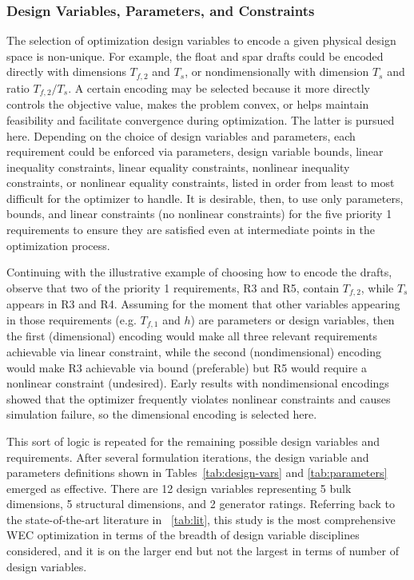 \subsubsection{Design Variables, Parameters, and Constraints}
The selection of optimization design variables to encode a given physical design space is non-unique. For example, the float and spar drafts could be encoded directly with dimensions $T_{f,2}$ and $T_s$, or nondimensionally with dimension $T_s$ and ratio $T_{f,2}/T_s$. A certain encoding may be selected because it more directly controls the objective value, makes the problem convex, or helps maintain feasibility and facilitate convergence during optimization. The latter is pursued here. Depending on the choice of design variables and parameters, each requirement could be enforced via parameters, design variable bounds, linear inequality constraints, linear equality constraints, nonlinear inequality constraints, or nonlinear equality constraints, listed in order from least to most difficult for the optimizer to handle. It is desirable, then, to use only parameters, bounds, and linear constraints (no nonlinear constraints) for the five priority 1 requirements to ensure they are satisfied even at intermediate points in the optimization process. 

Continuing with the illustrative example of choosing how to encode the drafts, observe that two of the priority 1 requirements, R3 and R5, contain $T_{f,2}$, while $T_s$ appears in R3 and R4. Assuming for the moment that other variables appearing in those requirements (e.g. $T_{f,1}$ and $h$) are parameters or design variables, then the first (dimensional) encoding would make all three relevant requirements achievable via linear constraint, while the second (nondimensional) encoding would make R3 achievable via bound (preferable) but R5 would require a nonlinear constraint (undesired). Early results with nondimensional encodings \cite{mccabe_multidisciplinary_2022} showed that the optimizer frequently violates nonlinear constraints and causes simulation failure, so the dimensional encoding is selected here.

This sort of logic is repeated for the remaining possible design variables and requirements. After several formulation iterations, the design variable and parameters definitions shown in Tables~\ref{tab:design-vars} and \ref{tab:parameters} emerged as effective. There are 12 design variables representing 5 bulk dimensions, 5 structural dimensions, and 2 generator ratings. Referring back to the state-of-the-art literature in \tablename~\ref{tab:lit}, this study is the most comprehensive WEC optimization in terms of the breadth of design variable disciplines considered, and it is on the larger end but not the largest in terms of number of design variables.

